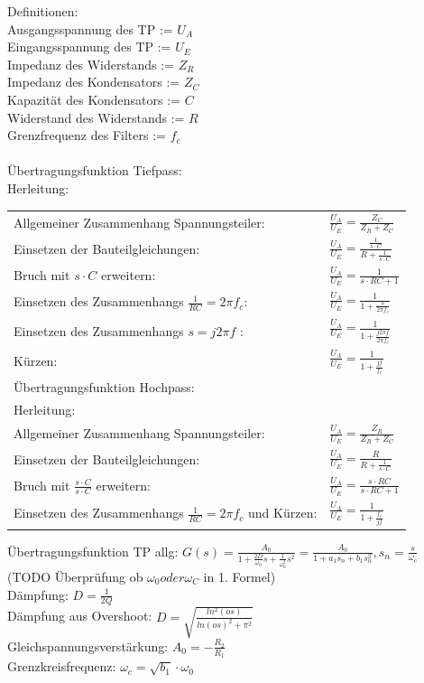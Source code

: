 \documentclass[A4]{scrartcl}
\begin{document}
  \newpage
  Definitionen:\\
  Ausgangsspannung des TP := $U_A$\\
  Eingangsspannung des TP := $U_E$\\
  Impedanz des Widerstands := $Z_R$\\
  Impedanz des Kondensators := $Z_C$\\
  Kapazität des Kondensators := $C$\\
  Widerstand des Widerstands := $R$\\
  Grenzfrequenz des Filters := $f_c$\\
  \\
  Übertragungsfunktion Tiefpass:\\
  Herleitung:\\ 
  \begin{tabular}{l|l}
    Allgemeiner Zusammenhang Spannungsteiler:& $\frac{U_A}{U_E} = \frac{Z_C}{Z_R+Z_C}$\\
    Einsetzen der Bauteilgleichungen:& $\frac{U_A}{U_E} = \frac{\frac{1}{s\cdot C}}{R + \frac{1}{s \cdot C}}$\\
    Bruch mit $s\cdot C$ erweitern:& $\frac{U_A}{U_E} = \frac{1}{s \cdot RC + 1}$\\
    Einsetzen des Zusammenhangs $\frac{1}{RC} = 2\pi f_c$:& $\frac{U_A}{U_E} = \frac{1}{1 + \frac{s}{2\pi f_c}}$\\
    Einsetzen des Zusammenhangs $s = j2\pi f$ :& $\frac{U_A}{U_E} = \frac{1}{1 + \frac{j2\pi f}{2\pi f_c}}$\\
    Kürzen:& $\frac{U_A}{U_E} = \frac{1}{1 + \frac{jf}{f_c}}$\\
    Übertragungsfunktion Hochpass:\\
    Herleitung:\\ 
    Allgemeiner Zusammenhang Spannungsteiler:& $\frac{U_A}{U_E} = \frac{Z_R}{Z_R+Z_C}$\\
    Einsetzen der Bauteilgleichungen:& $\frac{U_A}{U_E} = \frac{R}{R+\frac{1}{s \cdot C}}$\\
    Bruch mit $\frac{s\cdot C}{s\cdot C}$ erweitern:& $\frac{U_A}{U_E} = \frac{s \cdot RC}{s \cdot RC+1}$\\
    Einsetzen des Zusammenhangs $\frac{1}{RC} = 2\pi f_c$ und Kürzen:& $\frac{U_A}{U_E} = \frac{1}{1+\frac{f_c}{jf}}$\\
  \end{tabular}

  Übertragungsfunktion TP allg: $G(s) = \frac{A_0}{1+\frac{2D}{\omega_0}s+\frac{1}{\omega_0^2}s^2} = \frac{A_0}{1+a_1 s_n + b_1 s_n^2},s_n = \frac{s}{\omega_c}$ (TODO Überprüfung ob $\omega_0 oder \omega_C$ in 1. Formel)\\
  Dämpfung: $D = \frac{1}{2Q}$\\
  Dämpfung aus Overshoot: $D = \sqrt{\frac{ln^2(os)}{ln(os)^2+\pi^2}}$\\
  Gleichspannungsverstärkung: $A_0 = - \frac{R_2}{R_1}$\\
  Grenzkreisfrequenz: $\omega_c = \sqrt{b_1}\cdot \omega_0$\\
  
\end{document}
